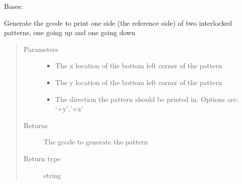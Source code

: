 \documentclass[letterpaper,10pt,english]{sphinxmanual}
\begin{document}
\begin{fulllineitems}
\label{\detokenize{index:calibration_pattern.calibration_pattern}}
\sphinxAtStartPar
Bases: 

\begin{fulllineitems}
\label{\detokenize{index:calibration_pattern.calibration_pattern.differential_interlocked_reference_pattern}}
\sphinxAtStartPar
Generate the gcode to print one side (the reference side) of two interlocked patterns, one going up and one going down
\begin{quote}\begin{description}
\item[{Parameters}] \leavevmode\begin{itemize}
\item {} 
\sphinxAtStartPar
{} \textendash{} The x location of the bottom left corner of the pattern

\item {} 
\sphinxAtStartPar
{} \textendash{} The y location of the bottom left corner of the pattern

\item {} 
\sphinxAtStartPar
{} \textendash{} The direction the pattern should be printed in. Options are: ‘+y’,’+x’

\end{itemize}

\item[{Returns}] \leavevmode
\sphinxAtStartPar
The gcode to generate the pattern

\item[{Return type}] \leavevmode
\sphinxAtStartPar
string

\end{description}\end{quote}


\end{fulllineitems}
\end{fulllineitems}
\end{document}

